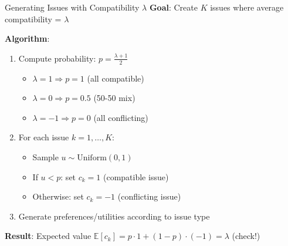 \documentclass{beamer}
\begin{document}
\begin{frame}{Generating Issues with Compatibility $\lambda$}
\textbf{Goal}: Create $K$ issues where average compatibility = $\lambda$

\vspace{0.5cm}

\textbf{Algorithm}:
\begin{enumerate}
    \item Compute probability: $p = \frac{\lambda + 1}{2}$
    \begin{itemize}
        \item $\lambda = 1 \Rightarrow p = 1$ (all compatible)
        \item $\lambda = 0 \Rightarrow p = 0.5$ (50-50 mix)
        \item $\lambda = -1 \Rightarrow p = 0$ (all conflicting)
    \end{itemize}
    
    \item For each issue $k = 1, \ldots, K$:
    \begin{itemize}
        \item Sample $u \sim \text{Uniform}(0,1)$
        \item If $u < p$: set $c_k = 1$ (compatible issue)
        \item Otherwise: set $c_k = -1$ (conflicting issue)
    \end{itemize}
    
    \item Generate preferences/utilities according to issue type
\end{enumerate}

\vspace{0.3cm}

\textbf{Result}: Expected value $\mathbb{E}[c_k] = p \cdot 1 + (1-p) \cdot (-1) = \lambda$ (check!)
\end{frame}
\end{document}
